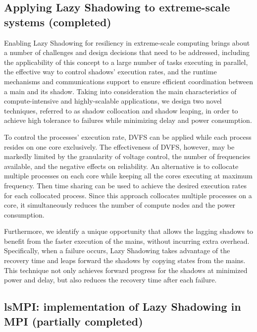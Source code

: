 \subsection{Applying Lazy Shadowing to extreme-scale systems (completed)}

Enabling Lazy Shadowing for resiliency in extreme-scale computing brings about a number of challenges and design decisions 
that need to be addressed, including the applicability of this concept to a large number of tasks executing in parallel, 
the effective way to control shadows’ execution rates, and the runtime mechanisms and communications support to ensure efficient 
coordination between a main and its shadow. Taking into consideration the main characteristics of compute-intensive and 
highly-scalable applications, we design two novel techniques, referred to as shadow collocation and shadow leaping, 
in order to achieve high tolerance to failures while minimizing delay and power consumption.

To control the processes' execution rate, DVFS can be applied while each process resides on one core exclusively. 
The effectiveness of DVFS, however, may be markedly 
limited by the granularity of voltage control, the number of frequencies available, and the negative effects on 
reliability. 
An alternative is to collocate multiple processes on each core while keeping all the cores executing at maximum frequency. 
Then time sharing can be used to achieve the desired execution rates for each collocated process. 
Since this approach collocates multiple processes on a core, it simultaneously reduces the number of compute nodes and 
the power consumption. 

Furthermore, we identify a unique opportunity that allows the lagging shadows to benefit from the faster execution 
of the mains, without incurring extra overhead. Specifically, when a failure occurs, Lazy Shadowing takes advantage of 
the recovery time and leaps forward the shadows by copying states from the mains. This technique not only achieves forward 
progress for the shadows at minimized power and delay, but also reduces the recovery time after each failure.

\subsection{lsMPI: implementation of Lazy Shadowing in MPI (partially completed)}

